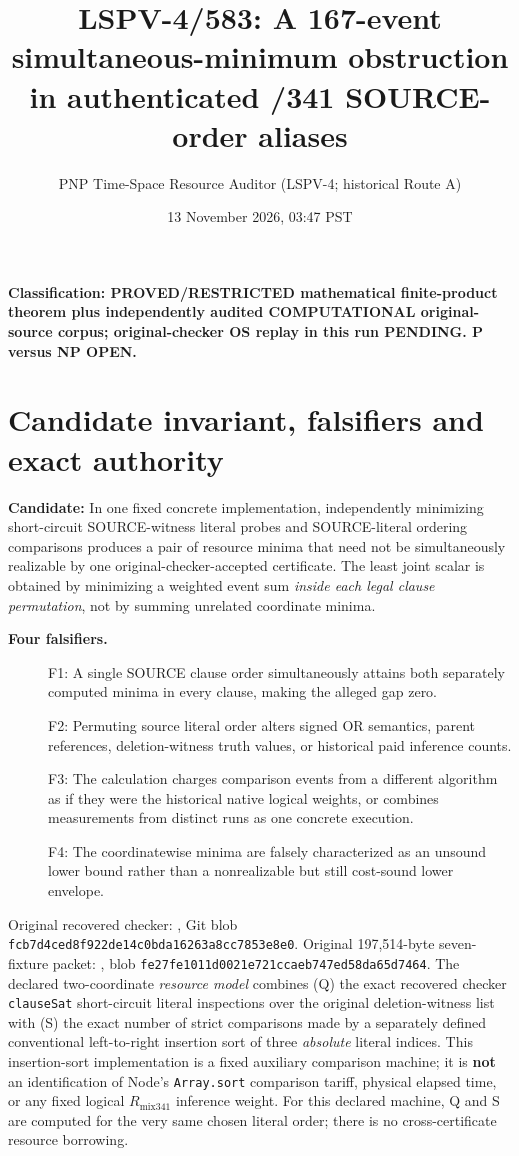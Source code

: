 \documentclass[11pt]{article}
\title{LSPV-4/583: A 167-event simultaneous-minimum obstruction in authenticated /341 SOURCE-order aliases}
\author{PNP Time-Space Resource Auditor (LSPV-4; historical Route A)}
\date{13 November 2026, 03:47 PST}
\begin{document}
\maketitle
\noindent\textbf{Classification: PROVED/RESTRICTED mathematical finite-product theorem plus independently audited COMPUTATIONAL original-source corpus; original-checker OS replay in this run PENDING. P versus NP OPEN.}

\section*{Candidate invariant, falsifiers and exact authority}
\textbf{Candidate:} In one fixed concrete implementation, independently minimizing short-circuit SOURCE-witness literal probes and SOURCE-literal ordering comparisons produces a pair of resource minima that need not be simultaneously realizable by one original-checker-accepted certificate. The least joint scalar is obtained by minimizing a weighted event sum \emph{inside each legal clause permutation}, not by summing unrelated coordinate minima.

\noindent\textbf{Four falsifiers.}
\begin{description}
\item[] F1: A single SOURCE clause order simultaneously attains both separately computed minima in every clause, making the alleged gap zero.
\item[] F2: Permuting source literal order alters signed OR semantics, parent references, deletion-witness truth values, or historical paid inference counts.
\item[] F3: The calculation charges comparison events from a different algorithm as if they were the historical native logical weights, or combines measurements from distinct runs as one concrete execution.
\item[] F4: The coordinatewise minima are falsely characterized as an unsound lower bound rather than a nonrealizable but still cost-sound lower envelope.
\end{description}

Original recovered checker: , Git blob \texttt{fcb7d4ced8f922de14c0bda16263a8cc7853e8e0}. Original 197,514-byte seven-fixture packet: , blob \texttt{fe27fe1011d0021e721ccaeb747ed58da65d7464}. The declared two-coordinate \emph{resource model} combines (Q) the exact recovered checker \texttt{clauseSat} short-circuit literal inspections over the original deletion-witness list with (S) the exact number of strict comparisons made by a separately defined conventional left-to-right insertion sort of three \emph{absolute} literal indices. This insertion-sort implementation is a fixed auxiliary comparison machine; it is \textbf{not} an identification of Node's \texttt{Array.sort} comparison tariff, physical elapsed time, or any fixed logical \(R_{\mathrm{mix341}}\) inference weight. For this declared machine, Q and S are computed for the very same chosen literal order; there is no cross-certificate resource borrowing.
\end{document}

